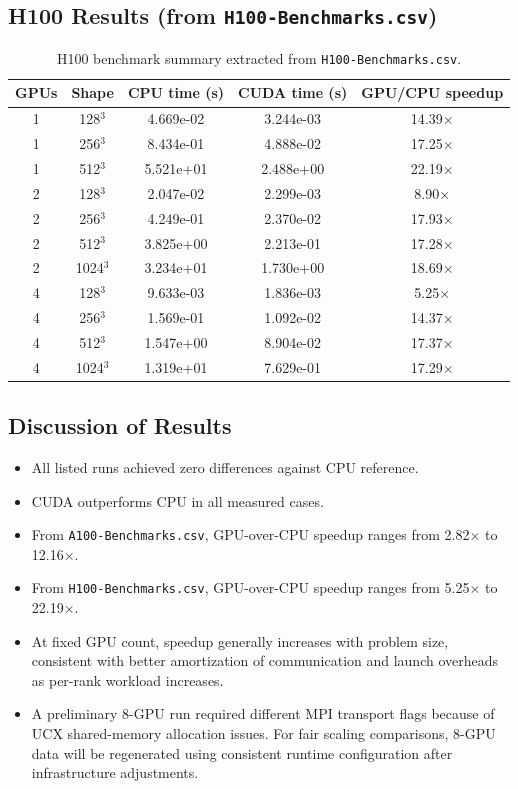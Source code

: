 \documentclass[11pt]{article}
\begin{document}
\subsection{H100 Results (from \texttt{H100-Benchmarks.csv})}
\begin{table}[H]
\centering
\scriptsize
\begin{tabular}{ccccc}
\toprule
GPUs & Shape & CPU time (s) & CUDA time (s) & GPU/CPU speedup \\
\midrule
1 & 128$^3$  & 4.669e-02 & 3.244e-03 & 14.39$\times$ \\
1 & 256$^3$  & 8.434e-01 & 4.888e-02 & 17.25$\times$ \\
1 & 512$^3$  & 5.521e+01 & 2.488e+00 & 22.19$\times$ \\
2 & 128$^3$  & 2.047e-02 & 2.299e-03 & 8.90$\times$ \\
2 & 256$^3$  & 4.249e-01 & 2.370e-02 & 17.93$\times$ \\
2 & 512$^3$  & 3.825e+00 & 2.213e-01 & 17.28$\times$ \\
2 & 1024$^3$ & 3.234e+01 & 1.730e+00 & 18.69$\times$ \\
4 & 128$^3$  & 9.633e-03 & 1.836e-03 & 5.25$\times$ \\
4 & 256$^3$  & 1.569e-01 & 1.092e-02 & 14.37$\times$ \\
4 & 512$^3$  & 1.547e+00 & 8.904e-02 & 17.37$\times$ \\
4 & 1024$^3$ & 1.319e+01 & 7.629e-01 & 17.29$\times$ \\
\bottomrule
\end{tabular}
\caption{H100 benchmark summary extracted from \texttt{H100-Benchmarks.csv}.}
\end{table}

\subsection{Discussion of Results}
\begin{itemize}[leftmargin=*]
\item All listed runs achieved zero differences against CPU reference.
\item CUDA outperforms CPU in all measured cases.
\item From \texttt{A100-Benchmarks.csv}, GPU-over-CPU speedup ranges from 2.82$\times$ to 12.16$\times$.
\item From \texttt{H100-Benchmarks.csv}, GPU-over-CPU speedup ranges from 5.25$\times$ to 22.19$\times$.
\item At fixed GPU count, speedup generally increases with problem size, consistent with better amortization of communication and launch overheads as per-rank workload increases.
\item A preliminary 8-GPU run required different MPI transport flags because of UCX shared-memory allocation issues. For fair scaling comparisons, 8-GPU data will be regenerated using consistent runtime configuration after infrastructure adjustments.
\end{itemize}
\end{document}
